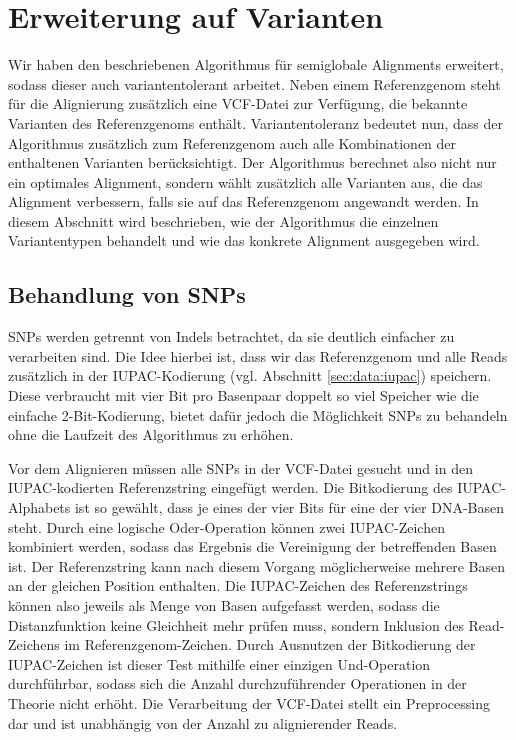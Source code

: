\section{Erweiterung auf Varianten}
\label{sec:align:variants}

Wir haben den beschriebenen Algorithmus für semiglobale Alignments erweitert, sodass dieser auch variantentolerant arbeitet. Neben einem Referenzgenom steht für die Alignierung zusätzlich eine VCF-Datei zur Verfügung, die bekannte Varianten des Referenzgenoms enthält. Variantentoleranz bedeutet nun, dass der Algorithmus zusätzlich zum Referenzgenom auch alle Kombinationen der enthaltenen Varianten berücksichtigt. Der Algorithmus berechnet also nicht nur ein optimales Alignment, sondern wählt zusätzlich alle Varianten aus, die das Alignment verbessern, falls sie auf das Referenzgenom angewandt werden. In diesem Abschnitt wird beschrieben, wie der Algorithmus die einzelnen Variantentypen behandelt und wie das konkrete Alignment ausgegeben wird.

\subsection{Behandlung von SNPs}
\label{sec:align:variants:snp}

SNPs werden getrennt von Indels betrachtet, da sie deutlich einfacher zu verarbeiten sind. Die Idee hierbei ist, dass wir das Referenzgenom und alle Reads zusätzlich in der IUPAC-Kodierung (vgl. Abschnitt \ref{sec:data:iupac}) speichern. Diese verbraucht mit vier Bit pro Basenpaar doppelt so viel Speicher wie die einfache 2-Bit-Kodierung, bietet dafür jedoch die Möglichkeit SNPs zu behandeln ohne die Laufzeit des Algorithmus zu erhöhen.

Vor dem Alignieren müssen alle SNPs in der VCF-Datei gesucht und in den IUPAC-kodierten Referenzstring eingefügt werden. Die Bitkodierung des IUPAC-Alphabets ist so gewählt, dass je eines der vier Bits für eine der vier DNA-Basen steht. Durch eine logische Oder-Operation können zwei IUPAC-Zeichen kombiniert werden, sodass das Ergebnis die Vereinigung der betreffenden Basen ist. Der Referenzstring kann nach diesem Vorgang möglicherweise mehrere Basen an der gleichen Position enthalten. Die IUPAC-Zeichen des Referenzstrings können also jeweils als Menge von Basen aufgefasst werden, sodass die Distanzfunktion  keine Gleichheit mehr prüfen muss, sondern Inklusion des Read-Zeichens im Referenzgenom-Zeichen. Durch Ausnutzen der Bitkodierung der IUPAC-Zeichen ist dieser Test mithilfe einer einzigen Und-Operation durchführbar, sodass sich die Anzahl durchzuführender Operationen in der Theorie nicht erhöht. Die Verarbeitung der VCF-Datei stellt ein Preprocessing dar und ist unabhängig von der Anzahl zu alignierender Reads.

